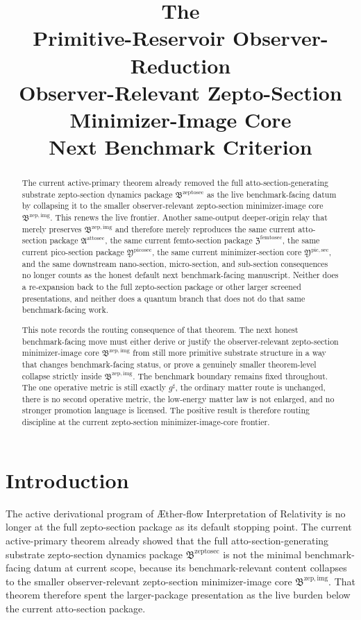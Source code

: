 \documentclass[11pt]{article}
\title{\textbf{The \TheoryName{}}\\[0.4em]
\large Primitive-Reservoir Observer-Reduction\\
\large Observer-Relevant Zepto-Section Minimizer-Image Core\\
\large Next Benchmark Criterion}
\author{}
\date{}
\newcommand{\Aflow}{\AE{}ther-flow}
\newcommand{\TheoryName}{\Aflow{} Interpretation of Relativity}
\newcommand{\CompletedMetric}{g^{\sharp}}
\newcommand{\AttoSectionPackage}{\mathfrak A^{\mathrm{attosec}}}
\newcommand{\ZeptoSectionPackage}{\mathfrak B^{\mathrm{zeptosec}}}
\newcommand{\ZeptoImageCore}{\mathfrak B^{\mathrm{zep,img}}}
\newcommand{\FemtoSectionPackage}{\mathfrak Z^{\mathrm{femtosec}}}
\newcommand{\PicoSectionPackage}{\mathfrak Y^{\mathrm{picosec}}}
\newcommand{\PicoMinSectionCore}{\mathfrak Y^{\mathrm{pic,sec}}}
\begin{document}
\maketitle

\begin{abstract}
The current active-primary theorem already removed the full atto-section-generating substrate zepto-section dynamics package \(\ZeptoSectionPackage\) as the live benchmark-facing datum by collapsing it to the smaller observer-relevant zepto-section minimizer-image core \(\ZeptoImageCore\). This renews the live frontier. Another same-output deeper-origin relay that merely preserves \(\ZeptoImageCore\) and therefore merely reproduces the same current atto-section package \(\AttoSectionPackage\), the same current femto-section package \(\FemtoSectionPackage\), the same current pico-section package \(\PicoSectionPackage\), the same current minimizer-section core \(\PicoMinSectionCore\), and the same downstream nano-section, micro-section, and sub-section consequences no longer counts as the honest default next benchmark-facing manuscript. Neither does a re-expansion back to the full zepto-section package or other larger screened presentations, and neither does a quantum branch that does not do that same benchmark-facing work.

This note records the routing consequence of that theorem. The next honest benchmark-facing move must either derive or justify the observer-relevant zepto-section minimizer-image core \(\ZeptoImageCore\) from still more primitive substrate structure in a way that changes benchmark-facing status, or prove a genuinely smaller theorem-level collapse strictly inside \(\ZeptoImageCore\). The benchmark boundary remains fixed throughout. The one operative metric is still exactly \(\CompletedMetric\), the ordinary matter route is unchanged, there is no second operative metric, the low-energy matter law is not enlarged, and no stronger promotion language is licensed. The positive result is therefore routing discipline at the current zepto-section minimizer-image-core frontier.
\end{abstract}

\section{Introduction}

The active derivational program of \TheoryName{} is no longer at the full zepto-section package as its default stopping point. The current active-primary theorem already showed that the full atto-section-generating substrate zepto-section dynamics package \(\ZeptoSectionPackage\) is not the minimal benchmark-facing datum at current scope, because its benchmark-relevant content collapses to the smaller observer-relevant zepto-section minimizer-image core \(\ZeptoImageCore\). That theorem therefore spent the larger-package presentation as the live burden below the current atto-section package.
\end{document}
